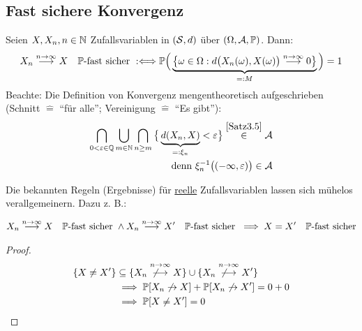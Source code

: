 \subsection*{Fast sichere Konvergenz} %
\begin{definition} %
Seien $X,X_n,n\in\N$ Zufallsvariablen in $(\S,d)$ über $(\Omega,\A,\P)$. Dann:
\begin{align*}
X_n\stackrel{n\to\infty}{\longrightarrow} X\quad\P\text{-fast sicher }:\Longleftrightarrow
\P\Big(\underbrace{\big\lbrace\omega\in\Omega:d\big(X_n(\omega),X(\omega)\big)\stackrel{n\to\infty}{\longrightarrow} 0\big\rbrace}_{=:M}\Big)=1
\end{align*}
Beachte: Die Definition von Konvergenz mengentheoretisch aufgeschrieben (Schnitt $\hat{=}$ ``für alle''; Vereinigung $\hat{=}$ ``Es gibt''):
\begin{align*}
\bigcap\limits_{0<\varepsilon\in\Q}
\bigcup\limits_{m\in\N}
\bigcap\limits_{n\geq m}
\big\lbrace\underbrace{d(X_n,X)}_{=:\xi_n}<\varepsilon\big\rbrace\stackrel{\ref{Satz3.5}}{\in}\A\\
\text{denn }\xi_n^{-1}\big((-\infty,\varepsilon)\big)\in\A
\end{align*}
\end{definition}

Die bekannten Regeln (Ergebnisse) für \underline{reelle} Zufallsvariablen lassen sich mühelos verallgemeinern. Dazu z. B.:

\begin{satz}\label{Satz3.7} %
\begin{align*}
X_n
\stackrel{n\to\infty}{\longrightarrow}
X\quad\P\text{-fast sicher }\wedge
X_n
\stackrel{n\to\infty}{\longrightarrow}
X'\quad\P\text{-fast sicher }
\implies
X=X'\quad\P\text{-fast sicher}
\end{align*}
\end{satz}
\begin{proof}
\begin{align*}
\lbrace X\neq X'\rbrace
&\subseteq\lbrace X_n
\stackrel{n\to\infty}{\not\longrightarrow}
X\rbrace
\cup\lbrace X_n
\stackrel{n\to\infty}{\not\longrightarrow}
X'\rbrace\\
&\implies
\P[X_n\not\to X]+\P[X_n\not\to X']=0+0\\
&\implies
\P[X\neq X']=0
\end{align*}
\end{proof}

